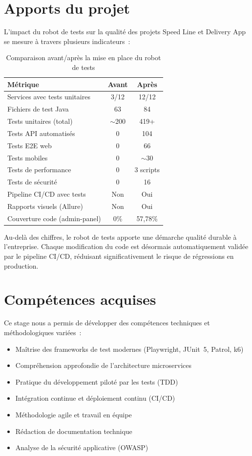 \section*{Apports du projet}

L'impact du robot de tests sur la qualité des projets Speed Line et Delivery App
se mesure à travers plusieurs indicateurs~:

\begin{table}[H]
\centering
\caption{Comparaison avant/après la mise en place du robot de tests}
\begin{tabular}{|l|c|c|}
\hline
\rowcolor{speedlineBlue!10}
\textbf{Métrique} & \textbf{Avant} & \textbf{Après} \\
\hline
Services avec tests unitaires & 3/12 & 12/12 \\
\hline
Fichiers de test Java & 63 & 84 \\
\hline
Tests unitaires (total) & $\sim$200 & 419+ \\
\hline
Tests API automatisés & 0 & 104 \\
\hline
Tests E2E web & 0 & 66 \\
\hline
Tests mobiles & 0 & $\sim$30 \\
\hline
Tests de performance & 0 & 3 scripts \\
\hline
Tests de sécurité & 0 & 16 \\
\hline
Pipeline CI/CD avec tests & Non & Oui \\
\hline
Rapports visuels (Allure) & Non & Oui \\
\hline
Couverture code (admin-panel) & 0\% & 57,78\% \\
\hline
\end{tabular}
\end{table}

Au-delà des chiffres, le robot de tests apporte une démarche qualité durable à
l'entreprise. Chaque modification du code est désormais automatiquement validée
par le pipeline CI/CD, réduisant significativement le risque de régressions en
production.

\section*{Compétences acquises}

Ce stage nous a permis de développer des compétences techniques et
méthodologiques variées~:

\begin{itemize}
  \item Maîtrise des frameworks de test modernes (Playwright, JUnit~5, Patrol, k6)
  \item Compréhension approfondie de l'architecture microservices
  \item Pratique du développement piloté par les tests (TDD)
  \item Intégration continue et déploiement continu (CI/CD)
  \item Méthodologie agile et travail en équipe
  \item Rédaction de documentation technique
  \item Analyse de la sécurité applicative (OWASP)
\end{itemize}

